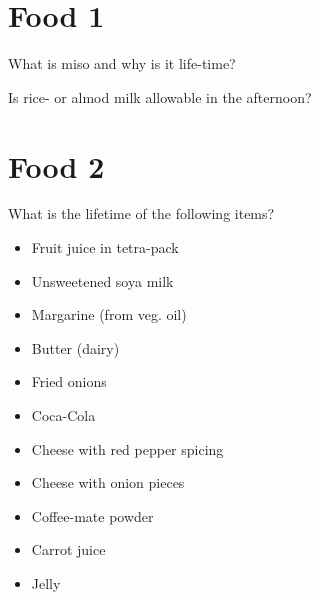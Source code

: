 \section{Food 1}

What is miso and why is it life-time?

Is rice- or almod milk allowable in the afternoon?

\section{Food 2}

What is the lifetime of the following items?

\begin{itemize}
\tightlist
\item
  Fruit juice in tetra-pack
\item
  Unsweetened soya milk
\item
  Margarine (from veg. oil)
\item
  Butter (dairy)
\item
  Fried onions
\item
  Coca-Cola
\item
  Cheese with red pepper spicing
\item
  Cheese with onion pieces
\item
  Coffee-mate powder
\item
  Carrot juice
\item
  Jelly
\end{itemize}

